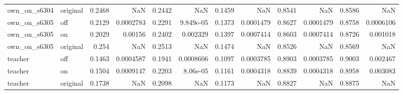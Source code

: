 \begin{table}
\begin{tabular}{llrrrrrrrrrr}
own\_on\_s6304 & original & 0.2468 & NaN & 0.2442 & NaN & 0.1459 & NaN & 0.8541 & NaN & 0.8586 & NaN \\
own\_on\_s6305 & off & 0.2129 & 0.0002783 & 0.2291 & 9.849e-05 & 0.1373 & 0.0001479 & 0.8627 & 0.0001479 & 0.8758 & 0.0006106 \\
own\_on\_s6305 & on & 0.2029 & 0.00156 & 0.2402 & 0.002329 & 0.1397 & 0.0007414 & 0.8603 & 0.0007414 & 0.8726 & 0.001018 \\
own\_on\_s6305 & original & 0.254 & NaN & 0.2513 & NaN & 0.1474 & NaN & 0.8526 & NaN & 0.8569 & NaN \\
teacher & off & 0.1463 & 0.0004587 & 0.1941 & 0.0008606 & 0.1097 & 0.0003785 & 0.8903 & 0.0003785 & 0.9003 & 0.002467 \\
teacher & on & 0.1504 & 0.0009147 & 0.2203 & 8.06e-05 & 0.1161 & 0.0004318 & 0.8839 & 0.0004318 & 0.8958 & 0.003083 \\
teacher & original & 0.1738 & NaN & 0.2098 & NaN & 0.1173 & NaN & 0.8827 & NaN & 0.8875 & NaN \\
\bottomrule
\end{tabular}
\end{table}
